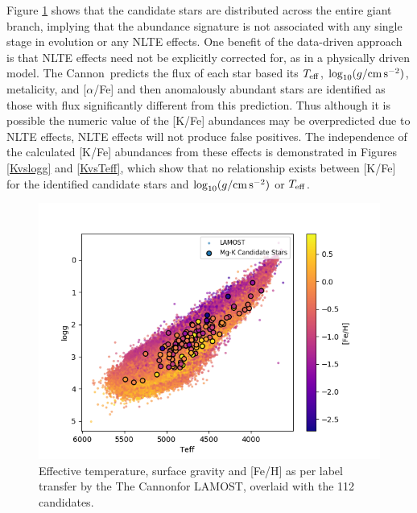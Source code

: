 \documentclass[a4paper,fleqn,usenatbib]{mnras}
\newcommand{\project}[1]{#1}
\newcommand{\tc}{\project{The Cannon}}
\newcommand{\teff}{T_{\rm eff}}
\newcommand{\logg}{\log_{10}(g/{\rm cm\,s}^{-2})}
\begin{document}
Figure \ref{loggTeffFeh} shows that the candidate stars are distributed across the entire giant branch, implying that the abundance signature is not associated with any single stage in evolution or any NLTE effects. One benefit of the data-driven approach is that NLTE effects need not be explicitly corrected for, as in a physically driven model. \tc\ predicts the flux of each star based its $\teff$, $\logg$, metalicity, and [$\alpha$/Fe] and then anomalously abundant stars are identified as those with flux significantly different from this prediction. Thus although it is possible the numeric value of the [K/Fe] abundances may be overpredicted due to NLTE effects, NLTE effects will not produce false positives. The independence of the calculated [K/Fe] abundances from these effects is demonstrated in Figures \ref{Kvslogg} and \ref{KvsTeff}, which show that no relationship exists between [K/Fe] for the identified candidate stars and $\logg$ or $\teff$. 

\begin{figure}
	\includegraphics[width=\columnwidth]{loggTeffFeH.png}
    \caption{Effective temperature, surface gravity and [Fe/H] as per label transfer by the \tc for LAMOST, overlaid with the 112 candidates.}
    \label{loggTeffFeh}
\end{figure}
\end{document}
